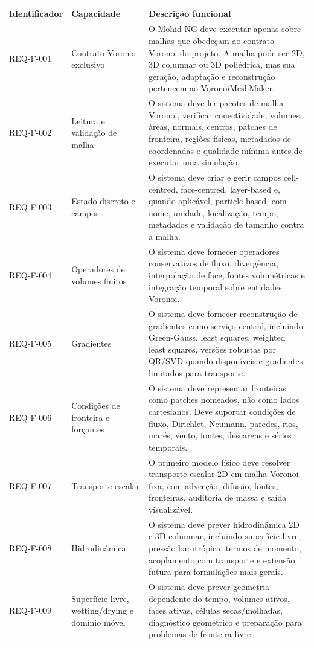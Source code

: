 \documentclass[11pt,a4paper]{article}
\begin{document}
\begin{longtable}{p{}p{}p{}}
\toprule
\textbf{Identificador} & \textbf{Capacidade} & \textbf{Descri\c{c}\~ao funcional}\tabularnewline
\midrule
REQ-F-001 & Contrato Voronoi exclusivo & O Mohid-NG deve executar apenas sobre malhas que obede\c{c}am ao contrato Voronoi do projeto. A malha pode ser 2D, 3D columnar ou 3D poli\'edrica, mas sua gera\c{c}\~ao, adapta\c{c}\~ao e reconstru\c{c}\~ao pertencem ao VoronoiMeshMaker.\tabularnewline
\addlinespace
REQ-F-002 & Leitura e valida\c{c}\~ao de malha & O sistema deve ler pacotes de malha Voronoi, verificar conectividade, volumes, \`areas, normais, centros, patches de fronteira, regi\~oes f\'isicas, metadados de coordenadas e qualidade m\'inima antes de executar uma simula\c{c}\~ao.\tabularnewline
\addlinespace
REQ-F-003 & Estado discreto e campos & O sistema deve criar e gerir campos cell-centred, face-centred, layer-based e, quando aplic\'avel, particle-based, com nome, unidade, localiza\c{c}\~ao, tempo, metadados e valida\c{c}\~ao de tamanho contra a malha.\tabularnewline
\addlinespace
REQ-F-004 & Operadores de volumes finitos & O sistema deve fornecer operadores conservativos de fluxo, diverg\^encia, interpola\c{c}\~ao de face, fontes volum\'etricas e integra\c{c}\~ao temporal sobre entidades Voronoi.\tabularnewline
\addlinespace
REQ-F-005 & Gradientes & O sistema deve fornecer reconstru\c{c}\~ao de gradientes como servi\c{c}o central, incluindo Green-Gauss, least squares, weighted least squares, vers\~oes robustas por QR/SVD quando dispon\'iveis e gradientes limitados para transporte.\tabularnewline
\addlinespace
REQ-F-006 & Condi\c{c}\~oes de fronteira e for\c{c}antes & O sistema deve representar fronteiras como patches nomeados, n\~ao como lados cartesianos. Deve suportar condi\c{c}\~oes de fluxo, Dirichlet, Neumann, paredes, rios, mar\'es, vento, fontes, descargas e s\'eries temporais.\tabularnewline
\addlinespace
REQ-F-007 & Transporte escalar & O primeiro modelo f\'isico deve resolver transporte escalar 2D em malha Voronoi fixa, com advec\c{c}\~ao, difus\~ao, fontes, fronteiras, auditoria de massa e sa\'ida visualiz\'avel.\tabularnewline
\addlinespace
REQ-F-008 & Hidrodin\^amica & O sistema deve prever hidrodin\^amica 2D e 3D columnar, incluindo superf\'icie livre, press\~ao barotr\'opica, termos de momento, acoplamento com transporte e extens\~ao futura para formula\c{c}\~oes mais gerais.\tabularnewline
\addlinespace
REQ-F-009 & Superf\'icie livre, wetting/drying e dom\'inio m\'ovel & O sistema deve prever geometria dependente do tempo, volumes ativos, faces ativas, c\'elulas secas/molhadas, diagn\'ostico geom\'etrico e prepara\c{c}\~ao para problemas de fronteira livre.\tabularnewline

\end{longtable}
\end{document}
